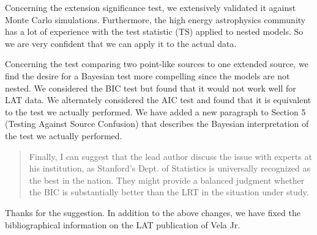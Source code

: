 \documentclass{article}
\newenvironment{referee}
{\begin{quote}\color{red}}
  {\end{quote}}
\newenvironment{reply}
  {}
  {}
\begin{document}
\begin{reply}
Concerning the extension significance test, we extensively validated it
against Monte Carlo simulations. Furthermore, the high energy astrophysics
community has a lot of experience with the test statistic (TS) applied to
nested models. So we are very confident that we can apply it to the actual
data.

Concerning the test comparing two point-like sources to one extended
source, we find the desire for a Bayesian test more compelling since the
models are not nested. We considered the BIC test but found that it would
not work well for LAT data. We alternately considered the AIC test and
found that it is equivalent to the test we actually performed. We have
added a new paragraph to Section 5 (Testing Against Source Confusion)
that describes the Bayesian interpretation of the test we actually performed.
\end{reply}


\begin{referee}
Finally, I can suggest that the lead author discuss the issue with experts
at his institution, as Stanford's Dept. of Statistics is universally
recognized as the best in the nation. They might provide a balanced
judgment whether the BIC is substantially better than the LRT in the
situation under study.
\end{referee}


\begin{reply}
Thanks for the suggestion.  In addition to the above changes, we have
fixed the bibliographical information on the LAT publication of Vela Jr.
\end{reply}
\end{document}
